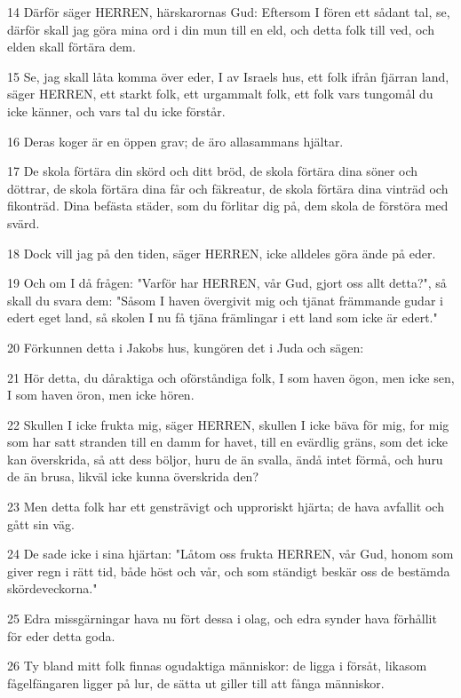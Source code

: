 \par 14 Därför säger HERREN, härskarornas Gud: Eftersom I fören ett sådant tal, se, därför skall jag göra mina ord i din mun till en eld, och detta folk till ved, och elden skall förtära dem.
\par 15 Se, jag skall låta komma över eder, I av Israels hus, ett folk ifrån fjärran land, säger HERREN, ett starkt folk, ett urgammalt folk, ett folk vars tungomål du icke känner, och vars tal du icke förstår.
\par 16 Deras koger är en öppen grav; de äro allasammans hjältar.
\par 17 De skola förtära din skörd och ditt bröd, de skola förtära dina söner och döttrar, de skola förtära dina får och fäkreatur, de skola förtära dina vinträd och fikonträd. Dina befästa städer, som du förlitar dig på, dem skola de förstöra med svärd.
\par 18 Dock vill jag på den tiden, säger HERREN, icke alldeles göra ände på eder.
\par 19 Och om I då frågen: "Varför har HERREN, vår Gud, gjort oss allt detta?", så skall du svara dem: "Såsom I haven övergivit mig och tjänat främmande gudar i edert eget land, så skolen I nu få tjäna främlingar i ett land som icke är edert."
\par 20 Förkunnen detta i Jakobs hus, kungören det i Juda och sägen:
\par 21 Hör detta, du dåraktiga och oförståndiga folk, I som haven ögon, men icke sen, I som haven öron, men icke hören.
\par 22 Skullen I icke frukta mig, säger HERREN, skullen I icke bäva för mig, for mig som har satt stranden till en damm for havet, till en evärdlig gräns, som det icke kan överskrida, så att dess böljor, huru de än svalla, ändå intet förmå, och huru de än brusa, likväl icke kunna överskrida den?
\par 23 Men detta folk har ett gensträvigt och upproriskt hjärta; de hava avfallit och gått sin väg.
\par 24 De sade icke i sina hjärtan: "Låtom oss frukta HERREN, vår Gud, honom som giver regn i rätt tid, både höst och vår, och som ständigt beskär oss de bestämda skördeveckorna."
\par 25 Edra missgärningar hava nu fört dessa i olag, och edra synder hava förhållit för eder detta goda.
\par 26 Ty bland mitt folk finnas ogudaktiga människor: de ligga i försåt, likasom fågelfängaren ligger på lur, de sätta ut giller till att fånga människor.
